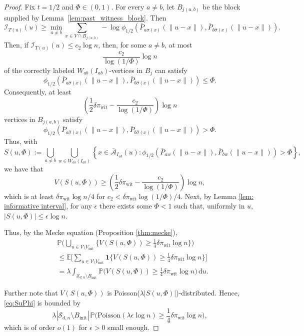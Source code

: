 \documentclass[11pt, a4paper]{amsart}
\renewcommand{\P}{\mathbb{P}}
\newcommand{\E}{\mathbb{E}}
\newcommand{\1}{\mathbf{1}}
\theoremstyle{definition}
\theoremstyle{remark}
\theoremstyle{definition}
\begin{document}
\begin{proof}
Fix $t=1/2$ and $\Phi\in(0,1)$. For every $a\neq b$, let $B_{j(a,b)}$ be the block supplied by
Lemma~\ref{lem:past_witness_block}. Then
\[
\mathcal I_{T(u)}(u)
\ge
\min_{a\neq b}
\sum_{x\in V\cap B_{j(a,b)}}
-\log
\phi_{1/2}\left(
\bar P_{a\widehat\sigma(x)}(\|u-x\|),
\bar P_{b\widehat\sigma(x)}(\|u-x\|)
\right).
\]
Then, if $\mathcal I_{T(u)}(u)
\leq c_2\log n$, then, for some $a\neq b$, at most
\[
\frac{c_2}{\log(1/\Phi)}\log n
\]
of the correctly labeled $W_{ab}(I_{ab})$-vertices in $B_j$ can
satisfy
\[
\phi_{1/2}\left(
\bar P_{a\hat\sigma(x)}(\|u-x\|),
\bar P_{b\hat\sigma(x)}(\|u-x\|)
\right)
\leq\Phi.
\]
Consequently, at least
\[
\left(
\frac12\delta\pi_{\mathrm{wit}}
-
\frac{c_2}{\log(1/\Phi)}
\right)\log n
\]
vertices in $B_{j(a,b)}$ satisfy
\[
\phi_{1/2}\left(
\bar P_{a\hat\sigma(x)}(\|u-x\|),
\bar P_{b\hat\sigma(x)}(\|u-x\|)
\right)
>\Phi.
\]
Thus, with 
\[
S(u,\Phi)
:=
\bigcup_{a\neq b}
\bigcup_{w\in W_{ab}(I_{ab})}
\left\{
x\in\bar{\mathcal A}_{I_{ab}}(u):
\phi_{1/2}\left(
\bar P_{aw}(\|u-x\|),
\bar P_{bw}(\|u-x\|)
\right)>\Phi
\right\},
\]
we have that
\[
V(S(u,\Phi)) \ge \left(
\frac12\delta\pi_{\mathrm{wit}}
-
\frac{c_2}{\log(1/\Phi)}
\right)\log n,
\]
which is at least $\delta \pi_{\mathrm{wit}} \log n/4$ for $c_2<\delta \pi_{\mathrm{wit}}\log (1/\Phi)/4$.
Next, by Lemma \ref{lem: informative interval}, for any $\epsilon$ there exists some $\Phi<1$ such that, uniformly in $u$, $|S(u,\Phi)|\le \epsilon \log n$.

Thus, by the Mecke equation (Proposition \ref{thm:mecke}), 
\begin{align}
&\P\Big(\bigcup_{u \in V\setminus V_{\mathrm{init}}} \Big\{V(S(u,\Phi)) \ge \frac 14 \delta \pi_{\mathrm{wit}} \log n \Big\}\Big)\nonumber\\
&\le \E \Big[\sum_{u \in V\setminus V_{\mathrm{init}}} \1\Big\{V(S(u,\Phi)) \ge 
\frac14\delta\pi_{\mathrm{wit}}
\log n\Big\}\Big]\nonumber\\
&= \lambda\int_{\mathcal S_{d,n}\setminus B_{\mathrm{init}}} \P\Big(V(S(u,\Phi)) \ge 
\frac14\delta\pi_{\mathrm{wit}}
\log n\Big)\,\mathrm d u.\label{eq:SuPhi}
\end{align}

Further note that $V(S(u,\Phi))$ is Poisson($\lambda |S(u,\Phi)|$)-distributed. Hence, \eqref{eq:SuPhi} is bounded by
\[
\lambda |\mathcal S_{d,n}\setminus B_{\mathrm{init}}| \,\P(\mathrm{Poisson}(\lambda \epsilon \log n) \ge \frac 14 \delta \pi_{\mathrm{wit}} \log n\Big),
\]
which is of order $o(1)$ for $\epsilon>0$ small enough.
\end{proof}
\end{document}

